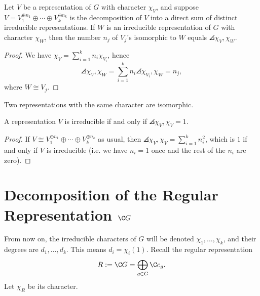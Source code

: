\begin{thm}[][label=thm:thm2]
    Let $V$ be a representation of $G$ with character $\chi_V$, and suppose $V=V_1^{\oplus n_1}\oplus \cdots \oplus V_k^{\oplus n_k}$ is the decomposition of $V$ into a direct sum of distinct irreducible representations. If $W$ is an irreducible representation of $G$ with character $\chi _W$, then the number $n_j$ of $V_j$'s isomorphic to $W$ equals $\angles{\chi _V,\chi_W}.$
\end{thm}

\begin{proof}
    We have $\chi _V = \sum_{i=1}^kn_i\chi _{V_i}$, hence
    $$\angles{\chi_V,\chi _W}=\sum_{i=1}^kn_i\angles{\chi_{V_i},\chi_W}=n_j,$$
    where $W \cong V_j$.
\end{proof}

\begin{cor}[][label=cor:cor1]
    Two representations with the same character are isomorphic.
\end{cor}

\begin{cor}[][label=cor:cor2]
    A representation $V$ is irreducible if and only if $\angles {\chi_V,\chi _V}=1$.
\end{cor}

\begin{proof}
    If $V \cong V_1^{\oplus n_1}\oplus \cdots \oplus V_k^{\oplus n_k}$ as usual, then
$\angles{\chi_V,\chi_V}=\sum_{i=1}^kn_i^2$, which is $1$ if and only if $V$ is irreducible (i.e. we have $n_i=1$ once and the rest of the $n_i$ are zero).
\end{proof}

\section[Decomposition of Regular Representation CG]{Decomposition of the Regular Representation $\C G$}

From now on, the irreducible characters of $G$ will be denoted $\chi_1,\dots,\chi_k$, and their degrees are $d_1,\dots,d_k$. This means $d_i=\chi_i(1)$. Recall the regular representation
$$R:= \C G = \bigoplus_{g \in G} \C e_g.$$
Let $\chi_R$ be its character.


